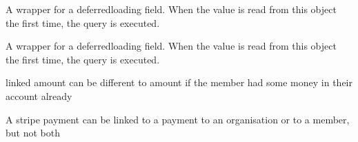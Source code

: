 \documentclass[letterpaper,10pt,english]{sphinxmanual}
\begin{document}
\begin{fulllineitems}

\begin{fulllineitems}
\label{\detokenize{payments:payments.models.StripeTransaction.id}}
A wrapper for a deferred\sphinxhyphen{}loading field. When the value is read from this
object the first time, the query is executed.

\end{fulllineitems}


\begin{fulllineitems}
\label{\detokenize{payments:payments.models.StripeTransaction.last_change_date}}
A wrapper for a deferred\sphinxhyphen{}loading field. When the value is read from this
object the first time, the query is executed.

\end{fulllineitems}


\begin{fulllineitems}
\label{\detokenize{payments:payments.models.StripeTransaction.linked_amount}}
linked amount can be different to amount if the member had some money in their account already

\end{fulllineitems}


\begin{fulllineitems}
\label{\detokenize{payments:payments.models.StripeTransaction.linked_member}}
A stripe payment can be linked to a payment to an organisation or
to a member, but not both

\end{fulllineitems}



\end{fulllineitems}
\end{document}
